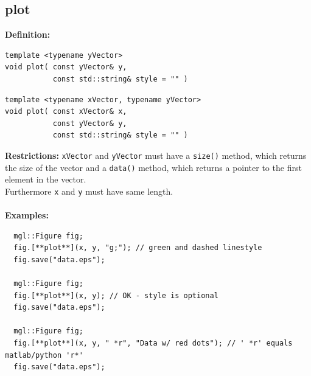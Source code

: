\documentclass[a4paper]{article}
\newcommand{\command}[1]{\subsection{#1}}
\begin{document}
\command{plot} 

\textbf{Definition:} 
\begin{lstlisting}
template <typename yVector>
void plot( const yVector& y, 
           const std::string& style = "" )
\end{lstlisting}

\begin{lstlisting}
template <typename xVector, typename yVector>
void plot( const xVector& x, 
           const yVector& y, 
           const std::string& style = "" )
\end{lstlisting}
\textbf{Restrictions:} \texttt{xVector} and \texttt{yVector} must have a \texttt{size()} method, which returns the size of the vector 
and a \texttt{data()} method, which returns a pointer to the first element in the vector. \\
Furthermore \texttt{x} and \texttt{y} must have same length. \\ \\
%
\textbf{Examples:}
\begin{lstlisting}
  mgl::Figure fig;
  fig.[**plot**](x, y, "g;"); // green and dashed linestyle
  fig.save("data.eps");

  mgl::Figure fig;
  fig.[**plot**](x, y); // OK - style is optional
  fig.save("data.eps");

  mgl::Figure fig;
  fig.[**plot**](x, y, " *r", "Data w/ red dots"); // ' *r' equals matlab/python 'r*'
  fig.save("data.eps");
\end{lstlisting}
\end{document}
